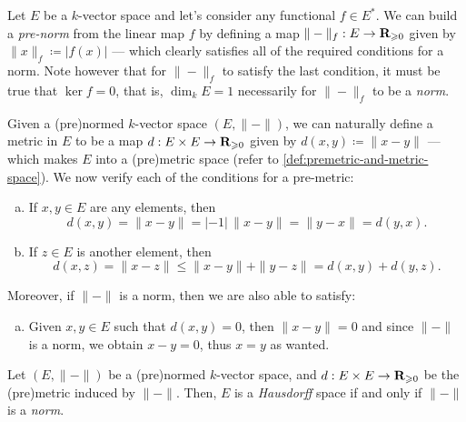 \begin{example}
    \label{exp:norm-from-functional}
    Let \(E\) be a \(k\)-vector space and let's consider any functional \(f \in
    E^{*}\). We can build a \emph{pre-norm} from the linear map \(f\) by defining a
    map \(\| - \|_f: E \to \mathbf{R}_{\geqslant 0}\) given by \(\| x \|_f \coloneq |f(x)|\) ---
    which clearly satisfies all of the required conditions for a norm. Note however
    that for \(\| - \|_f\) to satisfy the last condition, it must be true that
    \(\ker f = 0\), that is, \(\dim_{k} E = 1\) necessarily for \(\| - \|_f\) to be
    a \emph{norm}.
\end{example}

\begin{example}
    \label{exp:metric-from-norm}
    Given a (pre)normed \(k\)-vector space \((E, \| - \|)\), we can naturally
    define a metric in \(E\) to be a map \(d: E \times E \to \mathbf{R}_{\geqslant 0}\) given by
    \(d(x, y) \coloneq \| x - y \|\) --- which makes \(E\) into a (pre)metric
    space (refer to \cref{def:premetric-and-metric-space}). We now verify each of
    the conditions for a pre-metric:
    \begin{enumerate}[(a)]\setlength\itemsep{0em}
        \item If \(x, y \in E\) are any elements, then
              \[
                  d(x, y) = \| x - y \| = |-1|\, \| x - y \| = \| y - x \| = d(y, x).
              \]
        \item If \(z \in E\) is another element, then
              \[
                  d(x, z) = \| x - z \| \leq \| x - y \| + \| y - z \| = d(x, y) + d(y, z).
              \]
    \end{enumerate}
    Moreover, if \(\| - \|\) is a norm, then we are also able to satisfy:
    \begin{enumerate}[(a)]\setlength\itemsep{0em}\setcounter{enumi}{2}
        \item Given \(x, y \in E\) such that \(d(x, y) = 0\), then \(\| x - y \| = 0\)
              and since \(\| - \|\) is a norm, we obtain \(x - y = 0\), thus \(x = y\) as
              wanted.
    \end{enumerate}
\end{example}

\begin{proposition}
    \label{prop:hausdorff-space-norm}
    Let \((E, \| - \|)\) be a (pre)normed \(k\)-vector space, and \(d: E \times E
    \to \mathbf{R}_{\geqslant 0}\) be the (pre)metric induced by \(\| - \|\). Then, \(E\) is a
    \emph{Hausdorff} space if and only if \(\| - \|\) is a \emph{norm}.
\end{proposition}

